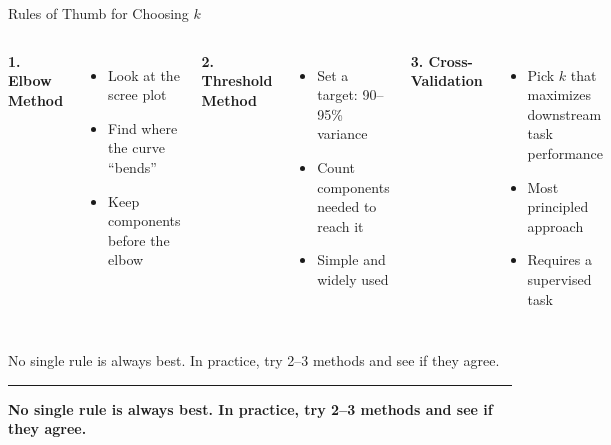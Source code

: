 \documentclass[8pt,aspectratio=169]{beamer}
\newcommand{\bottomnote}[1]{%
\vfill
\vspace{-2mm}
\textcolor{mllavender2}{\rule{\textwidth}{0.4pt}}
\vspace{1mm}
\footnotesize
\textbf{#1}
}
\newenvironment{compactlist}{%
  \begin{itemize}%
    \setlength{\itemsep}{2pt}%
    \setlength{\parskip}{0pt}%
    \setlength{\parsep}{0pt}%
}{%
  \end{itemize}%
}
\begin{document}
\begin{frame}[t]{Rules of Thumb for Choosing $k$}
\begin{columns}[T]
\small
\textbf{1. Elbow Method}
\begin{compactlist}
\item Look at the scree plot
\item Find where the curve ``bends''
\item Keep components before the elbow
\end{compactlist}

\small
\textbf{2. Threshold Method}
\begin{compactlist}
\item Set a target: 90--95\% variance
\item Count components needed to reach it
\item Simple and widely used
\end{compactlist}

\small
\textbf{3. Cross-Validation}
\begin{compactlist}
\item Pick $k$ that maximizes downstream task performance
\item Most principled approach
\item Requires a supervised task
\end{compactlist}
\end{columns}

\vspace{4mm}
\begin{block}{}
\small No single rule is always best. In practice, try 2--3 methods and see if they agree.
\end{block}

\bottomnote{No single rule is always best. In practice, try 2--3 methods and see if they agree.}
\end{frame}
\end{document}
